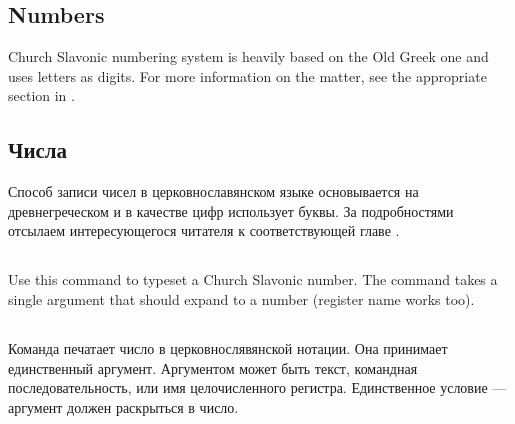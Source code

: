 \begin{EN}
\section{Numbers}

Church Slavonic numbering system is heavily based on the Old Greek one and uses 
letters as digits.
For more information on the matter, see the appropriate section in \cite{UN41}.
\end{EN}

\begin{RU}
\section{Числа}
Способ записи чисел в церковнославянском языке основывается на древнегреческом и в
качестве цифр использует буквы. За подробностями отсылаем интересующегося читателя к
соответствующей главе \cite{UN41}.
\end{RU}

\begin{EN}
\subsection{}
Use this command to typeset a Church Slavonic number.
The command takes a single argument that should expand to a number (register name works too).
\end{EN}

\begin{RU}
\subsection{}
Команда печатает число в церковнослявянской нотации.
Она принимает единственный аргумент. Аргументом может быть текст, командная последовательность, или имя 
целочисленного регистра. Единственное условие --- аргумент должен раскрыться в число.
\end{RU}

